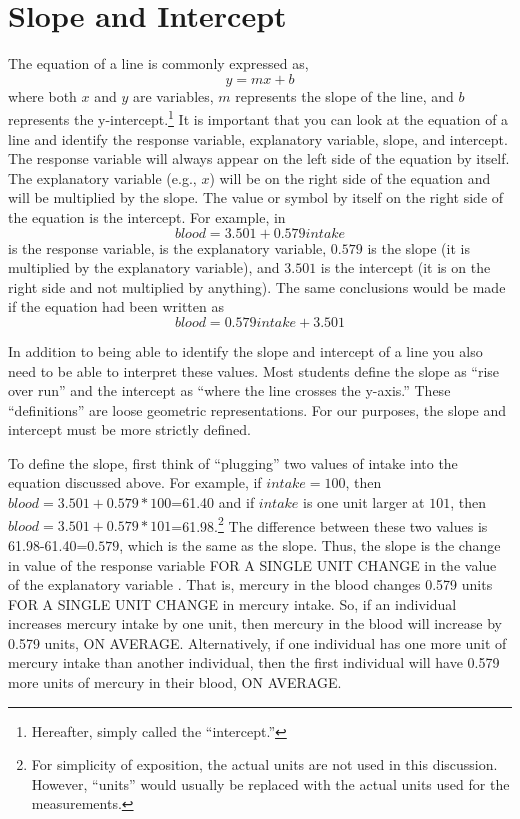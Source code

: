 \documentclass[10pt,openany]{book}\usepackage[]{graphicx}\usepackage[]{color}
\begin{document}
\section{Slope and Intercept}
The equation of a line is commonly expressed as,
  \[ y = mx + b  \]
where both $x$ and $y$ are variables, $m$ represents the slope of the line, and $b$ represents the y-intercept.\footnote{Hereafter, simply called the ``intercept.''}  It is important that you can look at the equation of a line and identify the response variable, explanatory variable, slope, and intercept. The response variable will always appear on the left side of the equation by itself. The explanatory variable (e.g., $x$) will be on the right side of the equation and will be multiplied by the slope. The value or symbol by itself on the right side of the equation is the intercept. For example, in
\[ blood = 3.501 + 0.579intake \]
 is the response variable,  is the explanatory variable, $0.579$ is the slope (it is multiplied by the explanatory variable), and $3.501$ is the intercept (it is on the right side and not multiplied by anything). The same conclusions would be made if the equation had been written as
  \[ blood = 0.579intake+3.501 \]


In addition to being able to identify the slope and intercept of a line you also need to be able to interpret these values. Most students define the slope as ``rise over run'' and the intercept as ``where the line crosses the y-axis.''  These ``definitions'' are loose geometric representations. For our purposes, the slope and intercept must be more strictly defined.

To define the slope, first think of ``plugging'' two values of intake into the equation discussed above. For example, if $intake=100$, then $blood=3.501+0.579*100$=61.40 and if $intake$ is one unit larger at $101$, then $blood=3.501+0.579*101$=61.98.\footnote{For simplicity of exposition, the actual units are not used in this discussion. However, ``units'' would usually be replaced with the actual units used for the measurements.} The difference between these two values is 61.98-61.40=$0.579$, which is the same as the slope. Thus, the slope is the change in value of the response variable FOR A SINGLE UNIT CHANGE in the value of the explanatory variable . That is, mercury in the blood changes 0.579 units FOR A SINGLE UNIT CHANGE in mercury intake. So, if an individual increases mercury intake by one unit, then mercury in the blood will increase by 0.579 units, ON AVERAGE. Alternatively, if one individual has one more unit of mercury intake than another individual, then the first individual will have 0.579 more units of mercury in their blood, ON AVERAGE.
\end{document}
